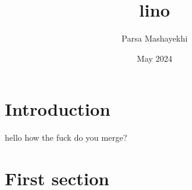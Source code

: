 \documentclass{article}
\title{lino}
\author{Parsa Mashayekhi}
\date{May 2024}
\begin{document}
\maketitle

\section{Introduction}
hello 
how the fuck do you merge?
\section{First section}
\end{document}
